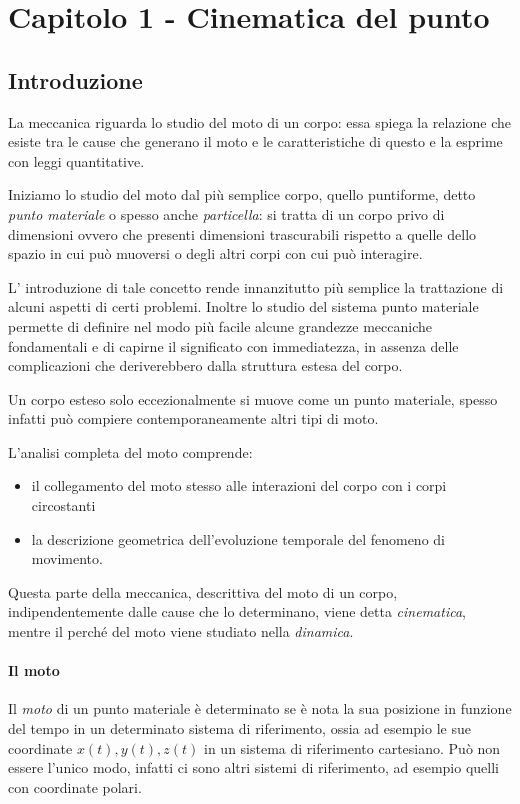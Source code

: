 \documentclass[class=book, crop=false, oneside, 12pt]{standalone}
\begin{document}
\section{Capitolo 1 - Cinematica del punto}

\subsection{Introduzione}

La meccanica riguarda lo studio del moto di un corpo: essa spiega la
relazione che esiste tra le cause che generano il moto e le
caratteristiche di questo e la esprime con leggi quantitative.

Iniziamo lo studio del moto dal più semplice corpo, quello puntiforme,
detto \emph{punto materiale} o spesso anche \emph{particella}: si tratta
di un corpo privo di dimensioni ovvero che presenti dimensioni
trascurabili rispetto a quelle dello spazio in cui può muoversi o degli
altri corpi con cui può interagire.

L' introduzione di tale concetto rende innanzitutto più semplice la
trattazione di alcuni aspetti di certi problemi. Inoltre lo studio del
sistema punto materiale permette di definire nel modo più facile alcune
grandezze meccaniche fondamentali e di capirne il significato con
immediatezza, in assenza delle complicazioni che deriverebbero dalla
struttura estesa del corpo.

Un corpo esteso solo eccezionalmente si muove come un punto materiale,
spesso infatti può compiere contemporaneamente altri tipi di moto.

L'analisi completa del moto comprende:

\begin{itemize}
\item
  il collegamento del moto stesso alle interazioni del corpo con i corpi
  circostanti
\item
  la descrizione geometrica dell'evoluzione temporale del fenomeno di
  movimento.
\end{itemize}

Questa parte della meccanica, descrittiva del moto di un corpo,
indipendentemente dalle cause che lo determinano, viene detta
\emph{cinematica}, mentre il perché del moto viene studiato nella
\emph{dinamica}.

\paragraph{Il moto}
Il \emph{moto} di un punto materiale è determinato se è nota la sua posizione
in funzione del tempo in un determinato sistema di riferimento, ossia ad
esempio le sue coordinate \(x(t), y(t),z(t)\) in un sistema di
riferimento cartesiano. Può non essere l'unico modo, infatti ci sono
altri sistemi di riferimento, ad esempio quelli con coordinate polari.
\end{document}
